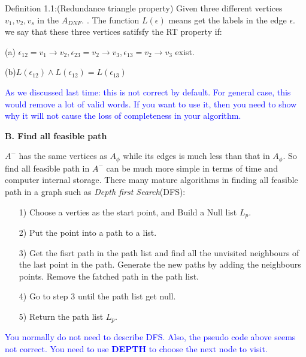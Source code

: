 \documentclass{article}
\newcommand{\blue}[1]{\textcolor{blue}{#1}}
\begin{document}
    Definition 1.1:(Redundance triangle property) Given three different vertices $v_1,v_2,v_s$ in the $A_{DNF}$. . The function $L(\epsilon)$ means get the labels in the edge $\epsilon$. we say that these three vertices satifsfy the RT property if:
     
    (a)   $\epsilon_{12}=v_1\rightarrow v_2,\epsilon_{23}=v_2\rightarrow v_3,
     \epsilon_{13}=v_2\rightarrow v_3$ exist.
     
     
     (b)$L(\epsilon_{12})\land L(\epsilon_{12})=L(\epsilon_{13})$

\blue{As we discussed last time: this is not correct by default. For general case, this would remove a lot of valid words. 
If you want to use it, then you need to show why it will not cause the loss of completeness in your algorithm.}





    \textbf{B. Find all feasible path}
    
    $A^-$ has the same vertices as $A_\phi$ while its edges is much less than that in $A_\phi$. So find all feasible path in $A^-$ can be much more simple in terms of time and computer internal storage. There many mature algorithms in finding all feasible path in a graph such as \emph{Depth first Search}(DFS):
    \begin{itemize}
    	\item[1)]
    	 Choose a verties as the start point, and Build a Null list $L_p$.
    \end{itemize}
    
    \begin{itemize}
    	\item[2)]
    Put the point into a path to a list.
    \end{itemize}
	\begin{itemize}
    \item[3)] 
    Get the fisrt path in the path list and find all the unvisited neighbours of the last point in the path. Generate the new paths by adding the neighbours points. Remove the fatched path in the path list. 
    \end{itemize}
	\begin{itemize}
	\item[4)] 
    Go to step 3 until the path list get null.
    \end{itemize}
    \begin{itemize}
    \item[5)] 
    Return the path list $L_p$.
     \end{itemize}
\blue{You normally do not need to describe DFS. Also, the pseudo code above seems not correct. You need to use \textbf{DEPTH} to choose the next node to visit.}
\end{document}
